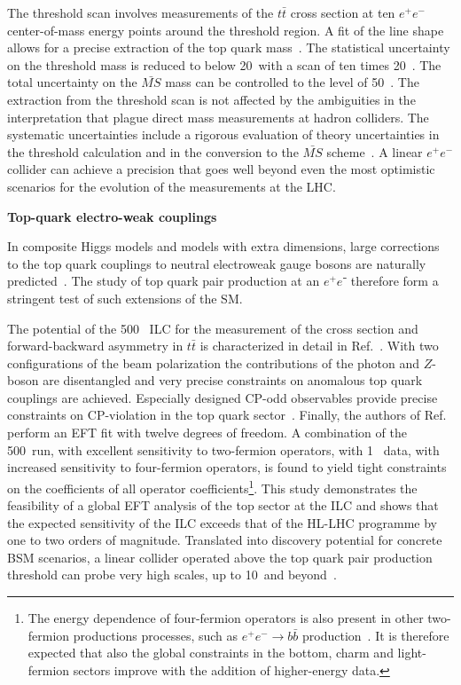 The threshold scan involves measurements of the $t\bar{t}$ cross section at ten $e^+e^-$
center-of-mass energy points around the threshold region. A fit of the line shape allows for
a precise extraction of the top quark mass~\cite{Martinez:2002st,Horiguchi:2013wra,Seidel:2013sqa}.
The statistical uncertainty on the threshold mass is reduced to below 20~\MeV with a scan of
ten times 20~\ifb. The total uncertainty on the $\bar{MS}$ mass can be controlled to the level
of 50~\mev. The extraction from the threshold scan is not affected by the ambiguities in the
interpretation that plague direct mass measurements at hadron colliders. The systematic uncertainties
include a rigorous evaluation of theory uncertainties in the threshold calculation and in the conversion
to the $\bar{MS}$ scheme~\cite{Simon:2016pwp}. A linear $e^+e^-$collider can achieve a precision that goes well beyond
even the most optimistic scenarios for the evolution of the measurements at the LHC.


{\bf Top-quark electro-weak couplings}

In composite Higgs models and models with extra dimensions, large corrections to the top quark couplings to
neutral electroweak gauge bosons are naturally predicted~\cite{Richard:2014upa,Barducci:2015aoa,Durieux:2018ekg}.
The study of top quark pair production at an $e^+e⁻$ therefore form a stringent test of such extensions of the SM.

The potential of the 500~\GeV{} ILC for the measurement of the cross section and forward-backward asymmetry in
$t\bar{t}$ is characterized in detail in Ref.~\cite{Amjad:2015mma}. With two configurations of the beam polarization
the contributions of the photon and $Z$-boson are disentangled and very precise constraints on anomalous top quark
couplings are achieved. Especially designed CP-odd observables provide precise constraints on CP-violation in the
top quark sector~\cite{Bernreuther:2017cyi}. Finally, the authors of Ref.~\cite{Durieux:2018tev} perform an EFT fit
with twelve degrees of freedom. A combination of the 500~\GeV run, with excellent sensitivity to two-fermion operators,
with 1~\TeV{} data, with increased sensitivity to four-fermion operators, is found to yield tight constraints on the
coefficients of all operator coefficients\footnote{The energy dependence of four-fermion operators is also present in
other two-fermion productions processes, such as $e^+e^- \rightarrow b\bar{b}$ production~\cite{Bilokin:2017lco}. It is
therefore expected that also the global constraints in the bottom, charm and light-fermion sectors improve with the addition
of higher-energy data.}. This study demonstrates the feasibility of a global EFT analysis of the top sector
at the ILC and shows that the expected sensitivity of the ILC exceeds that of the HL-LHC programme by one to two orders of
magnitude. Translated into discovery potential for concrete BSM scenarios, a linear collider operated above the top quark
pair production threshold can probe very high scales, up to 10~\TeV and beyond~\cite{Durieux:2018ekg}. 

